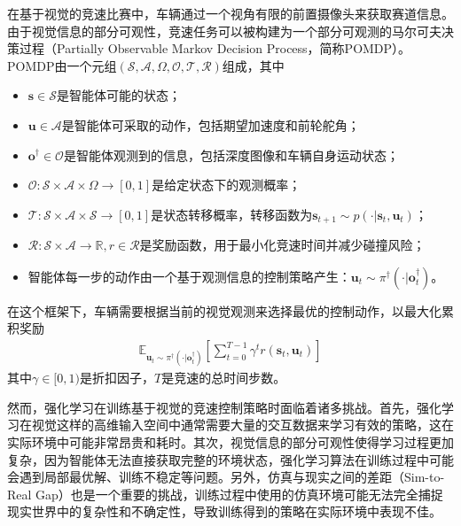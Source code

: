 在基于视觉的竞速比赛中，车辆通过一个视角有限的前置摄像头来获取赛道信息。由于视觉信息的部分可观性，竞速任务可以被构建为一个部分可观测的马尔可夫决策过程（Partially Observable Markov Decision Process，简称POMDP）。POMDP由一个元组$(\mathcal{S}, \mathcal{A}, \Omega, \mathcal{O}, \mathcal{T}, \mathcal{R})$组成，其中
\begin{itemize}
\item $\boldsymbol{s}\in\mathcal{S}$是智能体可能的状态；
\item $\boldsymbol{u}\in\mathcal{A}$是智能体可采取的动作，包括期望加速度和前轮舵角；
\item $\boldsymbol{o}^{\dagger}\in\mathcal{O}$是智能体观测到的信息，包括深度图像和车辆自身运动状态；
\item $\mathcal{O}:\mathcal{S}\times\mathcal{A}\times\Omega\rightarrow[0,1]$是给定状态下的观测概率；
\item $\mathcal{T}:\mathcal{S}\times\mathcal{A}\times\mathcal{S}\rightarrow[0,1]$是状态转移概率，转移函数为$\boldsymbol{s}_{t+1}\sim p(\cdot\vert\boldsymbol{s}_t,\boldsymbol{u}_t)$；
\item $\mathcal{R}:\mathcal{S}\times\mathcal{A}\rightarrow\mathbb{R}, r\in\mathcal{R}$是奖励函数，用于最小化竞速时间并减少碰撞风险；
\item 智能体每一步的动作由一个基于观测信息的控制策略产生：$\boldsymbol{u}_t\sim\pi^\dagger(\cdot\vert\boldsymbol{o}^\dagger_t)$。
\end{itemize}
在这个框架下，车辆需要根据当前的视觉观测来选择最优的控制动作，以最大化累积奖励
\begin{equation}
\begin{aligned}
\mathbb{E}_{\boldsymbol{u}_t\sim\pi^\dagger(\cdot\vert\boldsymbol{o}^\dagger_t)}\left[\sum_{t=0}^{T-1}\gamma^{t}r(\boldsymbol{s}_t,\boldsymbol{u}_t)\right]
\end{aligned}
\label{equ:pomdp}
\end{equation}
其中$\gamma\in[0,1)$是折扣因子，$T$是竞速的总时间步数。

然而，强化学习在训练基于视觉的竞速控制策略时面临着诸多挑战。首先，强化学习在视觉这样的高维输入空间中通常需要大量的交互数据来学习有效的策略，这在实际环境中可能非常昂贵和耗时\cite{yarats2021improving}。其次，视觉信息的部分可观性使得学习过程更加复杂，因为智能体无法直接获取完整的环境状态，强化学习算法在训练过程中可能会遇到局部最优解、训练不稳定等问题\cite{lauri2022partially}。另外，仿真与现实之间的差距（Sim-to-Real Gap）也是一个重要的挑战，训练过程中使用的仿真环境可能无法完全捕捉现实世界中的复杂性和不确定性，导致训练得到的策略在实际环境中表现不佳\cite{tobin2017domain}。

